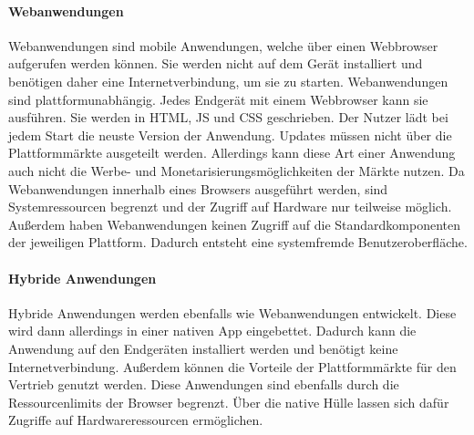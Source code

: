 \paragraph{Webanwendungen}
Webanwendungen sind mobile Anwendungen, welche über einen Webbrowser aufgerufen werden können. Sie werden nicht auf dem Gerät installiert und benötigen daher eine Internetverbindung, um sie zu starten. Webanwendungen sind plattformunabhängig. Jedes Endgerät mit einem Webbrowser kann sie ausführen. Sie werden in \gls{HTML}, \gls{JS} und \gls{CSS} geschrieben. Der Nutzer lädt bei jedem Start die neuste Version der Anwendung. Updates müssen nicht über die Plattformmärkte ausgeteilt werden. Allerdings kann diese Art einer Anwendung auch nicht die Werbe- und Monetarisierungsmöglichkeiten der Märkte nutzen. Da Webanwendungen innerhalb eines Browsers ausgeführt werden, sind Systemressourcen begrenzt und der Zugriff auf Hardware nur teilweise möglich. Außerdem haben Webanwendungen keinen Zugriff auf die Standardkomponenten der jeweiligen Plattform. Dadurch entsteht eine systemfremde Benutzeroberfläche.


\paragraph{Hybride Anwendungen}
Hybride Anwendungen werden ebenfalls wie Webanwendungen entwickelt. Diese wird dann allerdings in einer nativen App eingebettet. Dadurch kann die Anwendung auf den Endgeräten installiert werden und benötigt keine Internetverbindung. Außerdem können die Vorteile der Plattformmärkte für den Vertrieb genutzt werden. Diese Anwendungen sind ebenfalls durch die Ressourcenlimits der Browser begrenzt. Über die native Hülle lassen sich dafür Zugriffe auf Hardwareressourcen ermöglichen.


